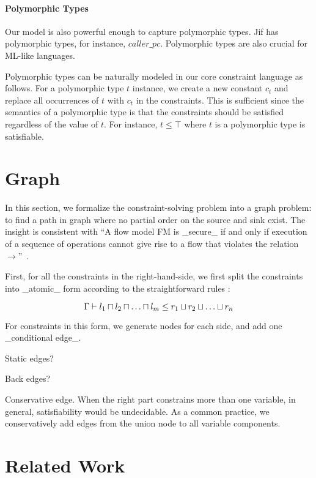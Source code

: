 \paragraph{Polymorphic Types}

Our model is also powerful enough to capture polymorphic types.  Jif
has polymorphic types, for instance, $caller\_pc$. Polymorphic types
are also crucial for ML-like languages.

Polymorphic types can be naturally modeled in our core constraint
language as follows. For a polymorphic type $t$ instance, we create a
new constant $c_t$ and replace all occurrences of $t$ with $c_t$ in
the constraints. This is sufficient since the semantics of a
polymorphic type is that the constraints should be satisfied
regardless of the value of $t$. For instance, $t\leq \top$ where $t$
is a polymorphic type is satisfiable.

\section{Graph} 

In this section, we formalize the constraint-solving problem into a
graph problem: to find a path in graph where no partial order on the
source and sink exist. The insight is consistent with ``A flow model
FM is _secure_ if and only if execution of a sequence of operations
cannot give rise to a flow that violates the relation
$\rightarrow$''~\cite{denning-lattice}.

First, for all the constraints in the right-hand-side, we
first split the constraints into _atomic_ form according to the
straightforward rules :

\[
\G \proves l_1 \meet l_2 \meet \dots \meet l_m \leq r_1 \join r_2 \join \dots
\join r_n
\]

For constraints in this form, we generate nodes for each side, and
add one _conditional edge_.

Static edges?

Back edges?

 Conservative edge. When the right part constrains more
than one variable, in general, satisfiability would be undecidable. As
a common practice, we conservatively add edges from the
union node to all variable components.

\section{Related Work}

